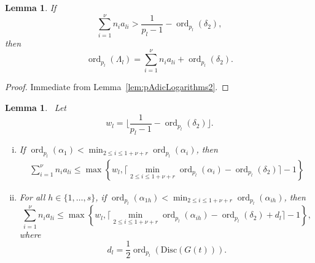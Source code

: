 \documentclass[11pt]{report}
\newtheorem{lemma}[theorem]{Lemma}
\theoremstyle{definition}
\DeclareMathOperator{\ord}{ord}
\begin{document}
\begin{lemma} \label{lem:Lambda}
If
\[\sum_{i = 1}^{\nu} n_{i}a_{li} > \frac{1}{p_l-1} - \ord_{p_l}(\delta_2),\]
then
\[\ord_{p_l}(\Lambda_l) = \sum_{i = 1}^{\nu} n_{i}a_{li} + \ord_{p_l}(\delta_2).\]
\end{lemma}

\begin{proof}
Immediate from Lemma~\ref{lem:pAdicLogarithms2}.
\end{proof}

\begin{lemma} \label{lem:specialcase} \
Let
\[w_l = \bigg\lfloor{\frac{1}{p_l-1} - \ord_{p_l}(\delta_2)}\bigg\rfloor.\]
\begin{enumerate}[(i)]
\item If $\ord_{p_l}(\alpha_1) < \displaystyle \min_{2 \leq i \leq 1+\nu+r} \ord_{p_l}(\alpha_i)$, then
\begin{align*}
\sum_{i = 1}^{\nu} n_i a_{li} \leq \max \left\{ w_l,  \bigg \lceil\displaystyle \min_{2 \leq i \leq 1+\nu+r} \ord_{p_l}(\alpha_{i}) - \ord_{p_l}(\delta_2) \bigg \rceil - 1 \right\}
\end{align*}

\item For all $h \in \{1, \dots, s\}$, if $\ord_{p_l}(\alpha_{1h}) < \displaystyle \min_{2 \leq i \leq 1+\nu+r} \ord_{p_l}(\alpha_{ih})$, then
\[\sum_{i = 1}^{\nu} n_i a_{li} \leq \max \left\{w_l, \bigg \lceil \displaystyle \min_{2 \leq i \leq 1+\nu+r} \ord_{p_l}(\alpha_{ih})- \ord_{p_l}(\delta_2) + d_l \bigg \rceil - 1\right\},\]
where
\[d_l = \frac{1}{2}\ord_{p_l}(\text{Disc}(G(t))).\]
\end{enumerate}
\end{lemma}
\end{document}
